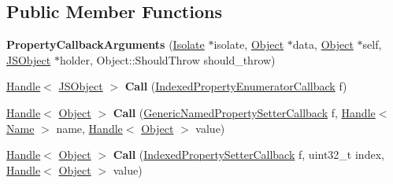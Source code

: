 \subsection*{Public Member Functions}
\begin{DoxyCompactItemize}
\item 
{\bfseries Property\+Callback\+Arguments} (\hyperlink{classv8_1_1internal_1_1_isolate}{Isolate} $\ast$isolate, \hyperlink{classv8_1_1internal_1_1_object}{Object} $\ast$data, \hyperlink{classv8_1_1internal_1_1_object}{Object} $\ast$self, \hyperlink{classv8_1_1internal_1_1_j_s_object}{J\+S\+Object} $\ast$holder, Object\+::\+Should\+Throw should\+\_\+throw)\hypertarget{classv8_1_1internal_1_1_property_callback_arguments_af4f0585208c068d194e5982af51cb5db}{}\label{classv8_1_1internal_1_1_property_callback_arguments_af4f0585208c068d194e5982af51cb5db}

\item 
\hyperlink{classv8_1_1internal_1_1_handle}{Handle}$<$ \hyperlink{classv8_1_1internal_1_1_j_s_object}{J\+S\+Object} $>$ {\bfseries Call} (\hyperlink{namespacev8_adbb0a6d5537371953f9ba807d4f6275e}{Indexed\+Property\+Enumerator\+Callback} f)\hypertarget{classv8_1_1internal_1_1_property_callback_arguments_ab3517e069c16439abe55c2515f08eb5d}{}\label{classv8_1_1internal_1_1_property_callback_arguments_ab3517e069c16439abe55c2515f08eb5d}

\item 
\hyperlink{classv8_1_1internal_1_1_handle}{Handle}$<$ \hyperlink{classv8_1_1internal_1_1_object}{Object} $>$ {\bfseries Call} (\hyperlink{namespacev8_af74716c6e95a269c6cd4314662fd0a7e}{Generic\+Named\+Property\+Setter\+Callback} f, \hyperlink{classv8_1_1internal_1_1_handle}{Handle}$<$ \hyperlink{classv8_1_1internal_1_1_name}{Name} $>$ name, \hyperlink{classv8_1_1internal_1_1_handle}{Handle}$<$ \hyperlink{classv8_1_1internal_1_1_object}{Object} $>$ value)\hypertarget{classv8_1_1internal_1_1_property_callback_arguments_a6924ba96ae20528d597a72733f0376b9}{}\label{classv8_1_1internal_1_1_property_callback_arguments_a6924ba96ae20528d597a72733f0376b9}

\item 
\hyperlink{classv8_1_1internal_1_1_handle}{Handle}$<$ \hyperlink{classv8_1_1internal_1_1_object}{Object} $>$ {\bfseries Call} (\hyperlink{namespacev8_a4ac7cc6185ebc8b6a199f9fa8e6bf5c3}{Indexed\+Property\+Setter\+Callback} f, uint32\+\_\+t index, \hyperlink{classv8_1_1internal_1_1_handle}{Handle}$<$ \hyperlink{classv8_1_1internal_1_1_object}{Object} $>$ value)\hypertarget{classv8_1_1internal_1_1_property_callback_arguments_a6b5d338e2ee5c84e15e3d73abbe3c409}{}\label{classv8_1_1internal_1_1_property_callback_arguments_a6b5d338e2ee5c84e15e3d73abbe3c409}


\end{DoxyCompactItemize}

